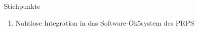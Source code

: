 Stichpunkte
\begin{enumerate}
\item Nahtlose Integration in das Software-Ökösystem des PRPS
\

\end{enumerate}
